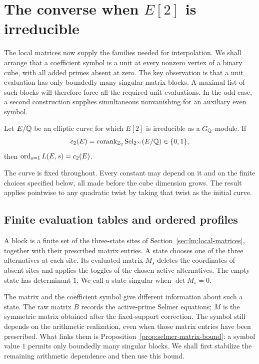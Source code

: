 \section{The converse when \texorpdfstring{$E[2]$}{E[2]} is irreducible}
\label{sec:sa:saturation}

The local matrices now supply the families needed for interpolation.
We shall arrange that a coefficient symbol is a unit at every nonzero
vertex of a binary cube, with all added primes absent at zero.
The key observation is that a unit evaluation has only boundedly many
singular matrix blocks.  A maximal list of such blocks will therefore
force all the required unit evaluations.  In the odd case, a second
construction supplies simultaneous nonvanishing for an auxiliary even
symbol.

\begin{theorem}
\label{thm:irreducible-converse}
Let $E/\mathbb Q$ be an elliptic curve for which $E[2]$ is irreducible as a
$G_{\mathbb Q}$-module.  If
\[
 c_2(E)=\operatorname{corank}_{\mathbb Z_2}\operatorname{Sel}_{2^\infty}(E/\mathbb Q)\in\{0,1\},
\]
then $\operatorname{ord}_{s=1}L(E,s)=c_2(E)$.
\end{theorem}

The curve is fixed throughout.  Every constant may depend on it and on
the finite choices specified below, all made before the cube dimension
grows.  The result applies pointwise to any quadratic twist by taking
that twist as the initial curve.

\subsection{Finite evaluation tables and ordered profiles}

A block is a finite set of the three-state sites of
Section~\ref{sec:lm:local-matrices}, together with their prescribed
matrix entries. A state chooses one of the three alternatives at each
site. Its evaluated matrix $M_s$ deletes the coordinates of absent sites
and applies the toggles of the chosen active alternatives. The empty state has determinant $1$.
We call a state singular when $\det M_s=0$.

The matrix and the coefficient symbol give different information about
such a state. The raw matrix $B$ records the active-prime Selmer equations;
$M$ is the symmetric matrix obtained after the fixed-support correction.
The symbol still depends on the arithmetic realization, even when those
matrix entries have been prescribed. What links them is
Proposition~\ref{prop:selmer-matrix-bound}: a symbol value $1$ permits
only boundedly many singular blocks. We shall first stabilize the
remaining arithmetic dependence and then use this bound.

